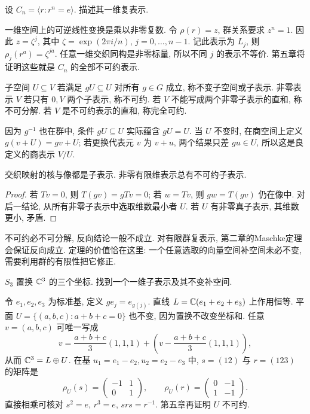 \begin{example}
设 $C_n=\langle r:r^n=e\rangle$. 描述其一维复表示.
\end{example}
\begin{solution}
一维空间上的可逆线性变换是乘以非零复数. 令 $\rho(r)=z$, 群关系要求 $z^n=1$. 因此 $z=\zeta^j$, 其中 $\zeta=\exp(2\pi i/n)$, $j=0,\ldots,n-1$. 记此表示为 $L_j$, 则 $\rho_j(r^a)=\zeta^{ja}$. 任意一维交织同构是非零标量, 所以不同 $j$ 的表示不等价. 第五章将证明这些就是 $C_n$ 的全部不可约表示.
\end{solution}

\begin{definition}
子空间 $U\subseteq V$ 若满足 $gU\subseteq U$ 对所有 $g\in G$ 成立, 称不变子空间或子表示. 非零表示 $V$ 若只有 $0,V$ 两个子表示, 称不可约. 若 $V$ 不能写成两个非零子表示的直和, 称不可分解. 若 $V$ 是不可约表示的直和, 称完全可约.
\end{definition}
因为 $g^{-1}$ 也在群中, 条件 $gU\subseteq U$ 实际蕴含 $gU=U$. 当 $U$ 不变时, 在商空间上定义 $g(v+U)=gv+U$; 若更换代表元 $v$ 为 $v+u$, 两个结果只差 $gu\in U$, 所以这是良定义的商表示 $V/U$.

\begin{proposition}\label{prop:kernelimage}
交织映射的核与像都是子表示. 非零有限维表示总有不可约子表示.
\end{proposition}
\begin{proof}
若 $Tv=0$, 则 $T(gv)=gTv=0$; 若 $w=Tv$, 则 $gw=T(gv)$ 仍在像中. 对后一结论, 从所有非零子表示中选取维数最小者 $U$. 若 $U$ 有非零真子表示, 其维数更小, 矛盾.
\end{proof}
不可约必不可分解, 反向结论一般不成立. 对有限群复表示, 第二章的Maschke定理会保证反向成立. 定理的价值恰在这里: 一个任意选取的向量空间补空间未必不变, 需要利用群的有限性把它修正.

\begin{example}\label{ex:permstandard}
$S_3$ 置换 $\mathbb C^3$ 的三个坐标. 找到一个一维子表示及其不变补空间.
\end{example}
\begin{solution}
令 $e_1,e_2,e_3$ 为标准基, 定义 $g e_j=e_{g(j)}$. 直线 $L=\mathbb C(e_1+e_2+e_3)$ 上作用恒等. 平面 $U=\{(a,b,c):a+b+c=0\}$ 也不变, 因为置换不改变坐标和. 任意 $v=(a,b,c)$ 可唯一写成
\[
 v=\frac{a+b+c}{3}(1,1,1)+\left(v-\frac{a+b+c}{3}(1,1,1)\right),
\]
从而 $\mathbb C^3=L\oplus U$. 在基 $u_1=e_1-e_2,u_2=e_2-e_3$ 中, $s=(12)$ 与 $r=(123)$ 的矩阵是
\[
 \rho_U(s)=\begin{pmatrix}-1&1\\0&1\end{pmatrix},\qquad
 \rho_U(r)=\begin{pmatrix}0&-1\\1&-1\end{pmatrix}.
\]
直接相乘可核对 $s^2=e$, $r^3=e$, $srs=r^{-1}$. 第五章再证明 $U$ 不可约.
\end{solution}

